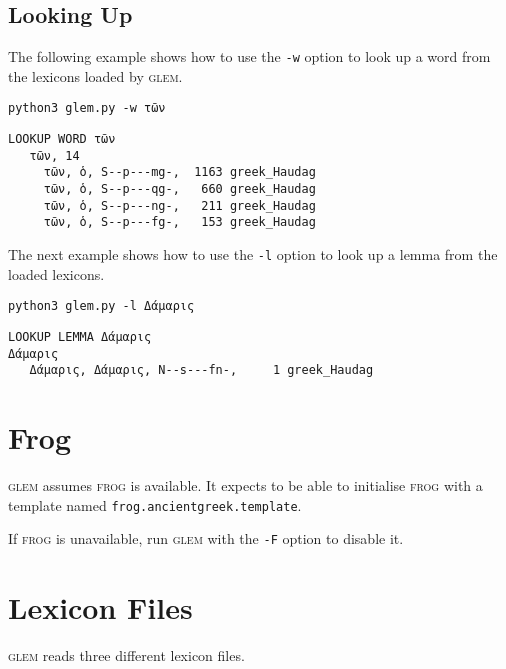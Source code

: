 \documentclass[a4paper]{article}
\def\glem{\textsc{glem}}
\def\frog{\textsc{frog}}
\begin{document}
\subsection*{Looking Up}

The following example shows how to use the \texttt{-w} option to look up a word
from the lexicons loaded by \glem{}.

\begin{tcolorbox}
\texttt{python3 glem.py -w τῶν}
\end{tcolorbox}

\begin{tcolorbox}
\begin{verbatim}
LOOKUP WORD τῶν
   τῶν, 14
     τῶν, ὁ, S--p---mg-,  1163 greek_Haudag
     τῶν, ὁ, S--p---qg-,   660 greek_Haudag
     τῶν, ὁ, S--p---ng-,   211 greek_Haudag
     τῶν, ὁ, S--p---fg-,   153 greek_Haudag
\end{verbatim}
\end{tcolorbox}

The next example shows how to use the \texttt{-l} option to look up a lemma from the
loaded lexicons.

\begin{tcolorbox}
\texttt{python3 glem.py -l Δάμαρις}
\end{tcolorbox}

\begin{tcolorbox}
\begin{verbatim}
LOOKUP LEMMA Δάμαρις
Δάμαρις
   Δάμαρις, Δάμαρις, N--s---fn-,     1 greek_Haudag
\end{verbatim}
\end{tcolorbox}

\section*{Frog}

\glem{} assumes \frog{} is available. It expects to be able to initialise
\frog{} with a template named \texttt{frog.ancientgreek.template}.

\par If \frog{} is unavailable, run \glem{} with the \texttt{-F} option to
disable it. 


\section*{Lexicon Files}

\glem{} reads three different lexicon files.
\end{document}
